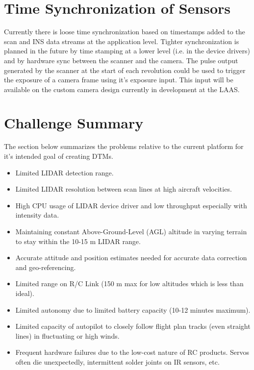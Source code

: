 \documentclass[a4paper,11pt]{report}
\begin{document}
\section{Time Synchronization of Sensors}
 
Currently there is loose time synchronization based on timestamps added to the scan and INS data streams at the application level. Tighter synchronization is planned in the future by time stamping at a lower level (i.e. in the device drivers) and by hardware sync between the scanner and the camera. The pulse output generated by the scanner at the start of each revolution could be used to trigger the exposure of a camera frame using it's exposure input. This input will be available on the custom camera design currently in development at the LAAS.

\section{Challenge Summary}

The section below summarizes the problems relative to the current platform for it's intended goal of creating DTMs.

\begin{itemize}
 \item Limited LIDAR detection range.
 \item Limited LIDAR resolution between scan lines at high aircraft velocities.
 \item High CPU usage of LIDAR device driver and low throughput especially with intensity data.
 \item Maintaining constant Above-Ground-Level (AGL) altitude in varying terrain to stay within the 10-15 m LIDAR range.
 \item Accurate attitude and position estimates needed for accurate data correction and geo-referencing.
 \item Limited range on R/C Link (150 m max for low altitudes which is less than ideal).
 \item Limited autonomy due to limited battery capacity (10-12 minutes maximum).
 \item Limited capacity of autopilot to closely follow flight plan tracks (even straight lines) in fluctuating or high winds.
 \item Frequent hardware failures due to the low-cost nature of RC products. Servos often die unexpectedly, intermittent solder joints on IR sensors, etc.
\end{itemize}
\end{document}

